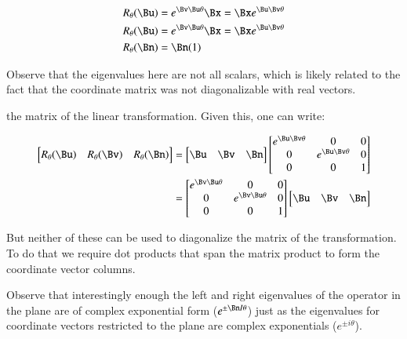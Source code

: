 \begin{align*}
R_\theta(\Bu) &= e^{\Bv \Bu \theta} \Bx = \Bx e^{\Bu \Bv \theta} \\
R_\theta(\Bu) &= e^{\Bv \Bu \theta} \Bx = \Bx e^{\Bu \Bv \theta} \\
R_\theta(\Bn) &= \Bn (1) \\
\end{align*}

Observe that the eigenvalues here are not all scalars, which is likely related
to the fact that the coordinate matrix was not diagonalizable with real vectors.

the matrix of the linear transformation.  
Given this, one can write:

\begin{align*}
\begin{bmatrix}
R_\theta(\Bu) & R_\theta(\Bv) & R_\theta(\Bn) \\
\end{bmatrix}
&=
\begin{bmatrix}
\Bu & \Bv & \Bn \\
\end{bmatrix}
\begin{bmatrix}
e^{\Bu \Bv \theta} & 0 & 0 \\
0 & e^{\Bu \Bv \theta} & 0 \\
0 & 0 & 1 \\
\end{bmatrix} \\
&=
\begin{bmatrix}
e^{\Bv \Bu \theta} & 0 & 0 \\
0 & e^{\Bv \Bu \theta} & 0 \\
0 & 0 & 1 \\
\end{bmatrix}
\begin{bmatrix}
\Bu & \Bv & \Bn \\
\end{bmatrix}
\end{align*}

But neither of these can be used to diagonalize the matrix of the transformation.  To do that
we require dot products that span the matrix product to form the coordinate vector columns.

Observe that interestingly
enough the left and right eigenvalues of the operator in the plane are of complex exponential form ($e^{\pm \Bn I \theta}$) just as the eigenvalues for 
coordinate vectors restricted to the plane are complex exponentials ($e^{\pm i\theta}$).

